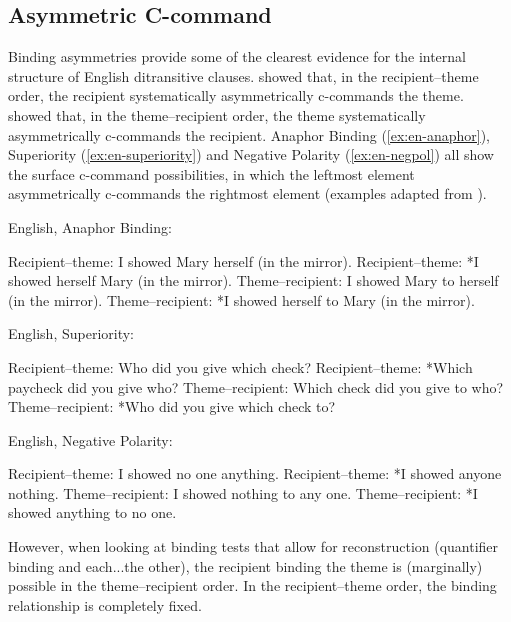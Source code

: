 	\subsection{Asymmetric C-command}
	Binding asymmetries provide some of the clearest evidence for the internal structure of English ditransitive clauses. \cite{Barss.1986} showed that, in the recipient--theme order, the recipient systematically asymmetrically c-commands the theme. \cite{Aoun.1989} showed that, in the theme--recipient order, the theme systematically asymmetrically c-commands the recipient.  Anaphor Binding (\ref{ex:en-anaphor}), Superiority (\ref{ex:en-superiority}) and Negative Polarity (\ref{ex:en-negpol}) all show the surface c-command possibilities, in which the leftmost element asymmetrically c-commands the rightmost element (examples adapted from \cite{Aoun.1989}).
\begin{exe}
	\ex English, Anaphor Binding:\label{ex:en-anaphor}
\begin{xlist}
\ex Recipient--theme: I showed Mary herself (in the mirror).
\ex Recipient--theme: *I showed herself Mary (in the mirror).
\ex Theme--recipient: I showed Mary to herself (in the mirror).
\ex Theme--recipient: *I showed herself to Mary (in the mirror).
\end{xlist}
\ex English, Superiority:\label{ex:en-superiority}
\begin{xlist}
\ex Recipient--theme: Who did you give which check?
\ex Recipient--theme: *Which paycheck did you give who?
\ex Theme--recipient: Which check did you give to who?
\ex Theme--recipient: *Who did you give which check to?
\end{xlist}
\ex English, Negative Polarity:\label{ex:en-negpol}
\begin{xlist}
\ex Recipient--theme: I showed no one anything.
\ex Recipient--theme: *I showed anyone nothing.
\ex Theme--recipient: I showed nothing to any one.
\ex Theme--recipient: *I showed anything to no one.
\end{xlist}
\end{exe}

However, when looking at binding tests that allow for reconstruction (quantifier binding and each...the other), the recipient binding the theme is (marginally) possible in the theme--recipient order. In the recipient--theme order, the binding relationship is completely fixed. 

